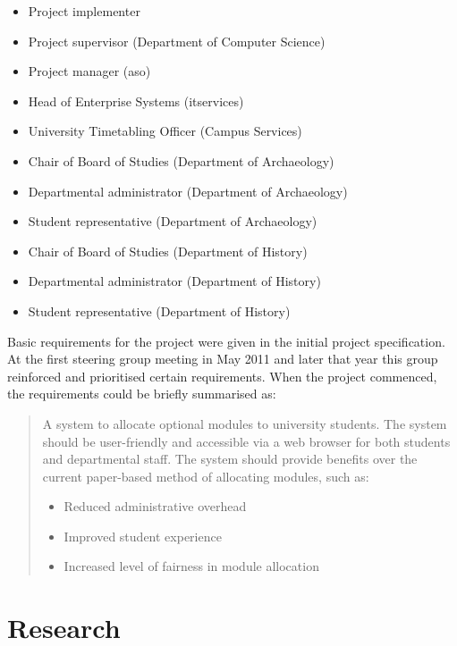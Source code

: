 \documentclass[draft]{scrartcl}
\begin{document}
\begin{itemize}
  \item Project implementer
  \item Project supervisor (Department of Computer Science)
  \item Project manager (\gls{aso})
  \item Head of Enterprise Systems (\gls{itservices})
  \item University Timetabling Officer (Campus Services)
  \item Chair of Board of Studies (Department of Archaeology)
  \item Departmental administrator (Department of Archaeology)
  \item Student representative (Department of Archaeology)
  \item Chair of Board of Studies (Department of History)
  \item Departmental administrator (Department of History)
  \item Student representative (Department of History)
\end{itemize}

Basic requirements for the project were given in the initial project
specification. At the first steering group meeting in May 2011 and later that
year this group reinforced and prioritised certain requirements. When the
project commenced, the requirements could be briefly summarised as:

\begin{quote}
  A system to allocate optional modules to university students. The system
  should be user-friendly and accessible via a web browser for both students
  and departmental staff. The system should provide benefits over the current
  paper-based method of allocating modules, such as:
  \begin{itemize}
    \item Reduced administrative overhead
    \item Improved student experience
    \item Increased level of fairness in module allocation
  \end{itemize}
\end{quote}

% 

\section{Research}
\label{sec:research}
\end{document}

